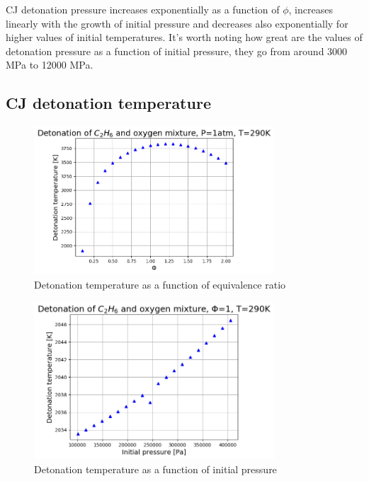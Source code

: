 \documentclass[a4paper]{article}
\begin{document}
CJ detonation pressure increases exponentially as a function of $\phi$, increases linearly with the growth of initial pressure and decreases also exponentially for higher values of initial temperatures. It's worth noting how great are the values of detonation pressure as a function of initial pressure, they go from around 3000 MPa to 12000 MPa.

\subsection{CJ detonation temperature}
\begin{figure}[H]
\centering
\includegraphics[width=0.8\textwidth]{temperature_Fi.png}
\caption{Detonation temperature as a function of equivalence ratio}
\end{figure}

\begin{figure}[H]
\centering
\includegraphics[width=0.8\textwidth]{temperature_Pi.png}
\caption{Detonation temperature as a function of initial pressure}
\end{figure}
\end{document}
